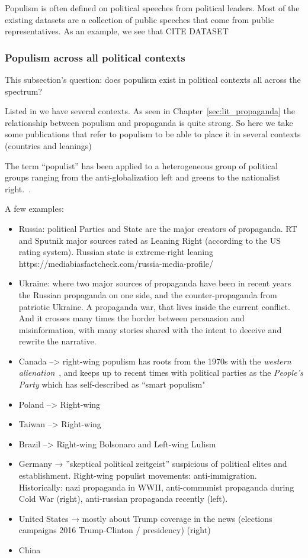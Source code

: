 Populism is often defined on political speeches from political leaders. Most of the existing datasets are a collection of public speeches that come from public representatives.
As an example, we see that CITE DATASET


\subsubsection{\statusorange Populism across all political contexts}
This subsection’s question: does populism exist in political contexts all across the spectrum?


Listed in \citet{woolley2018computational} we have several contexts. 
As seen in Chapter~\ref{sec:lit_propaganda} the relationship between populism and propaganda is quite strong. So here we take some publications that refer to populism to be able to place it in several contexts (countries and leanings)

The term ``populist” has been applied to a heterogeneous group of political groups ranging from the anti-globalization left and greens to the nationalist right.~\citep{kuzio2010populism}.

A few examples:
\begin{itemize}
    \item Russia: political Parties and State are the major creators of propaganda. RT and Sputnik major sources rated as Leaning Right (according to the US rating system). Russian state is extreme-right leaning https://mediabiasfactcheck.com/russia-media-profile/
    \item Ukraine: where two major sources of propaganda have been in recent years the Russian propaganda on one side, and the counter-propaganda from patriotic Ukraine. A propaganda war, that lives inside the current conflict. And it crosses many times the border between persuasion and misinformation, with many stories shared with the intent to deceive and rewrite the narrative.
    \item Canada --> right-wing populism has roots from the 1970s with the \emph{western alienation}~\citep{henry2000revisiting}, and keeps up to recent times with political parties as the \emph{People's Party} which has self-described as ``smart populism"
    \item Poland --> Right-wing
    \item Taiwan --> Right-wing
    \item Brazil --> Right-wing Bolsonaro and Left-wing Lulism
    \item Germany → ”skeptical political zeitgeist” suspicious of political elites and establishment. Right-wing populist movements: anti-immigration. Historically: nazi propaganda in WWII, anti-communist propaganda during Cold War (right), anti-russian propaganda recently (left).
    \item United States → mostly about Trump coverage in the news (elections campaigns 2016 Trump-Clinton / presidency) (right)
    \item China
\end{itemize}


